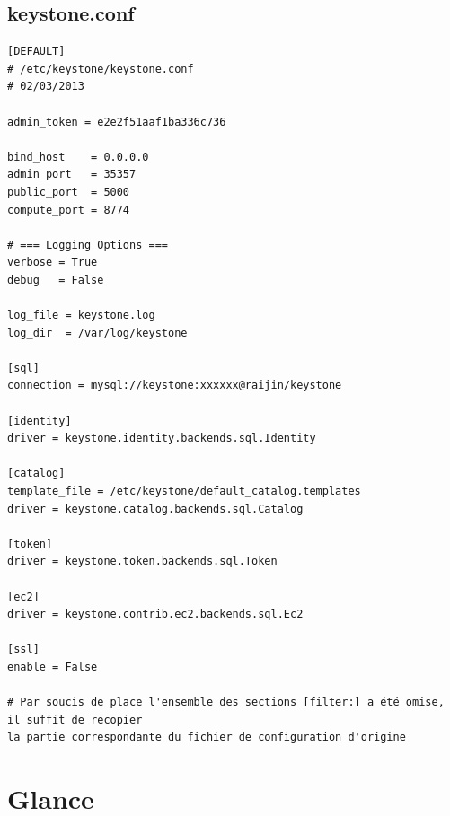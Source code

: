 \documentclass[a4paper,oneside]{report}
\begin{document}
\subsection{keystone.conf}
\begin{verbatim}
[DEFAULT]
# /etc/keystone/keystone.conf
# 02/03/2013

admin_token = e2e2f51aaf1ba336c736

bind_host    = 0.0.0.0
admin_port   = 35357
public_port  = 5000
compute_port = 8774

# === Logging Options ===
verbose = True
debug   = False

log_file = keystone.log
log_dir  = /var/log/keystone

[sql]
connection = mysql://keystone:xxxxxx@raijin/keystone

[identity]
driver = keystone.identity.backends.sql.Identity

[catalog]
template_file = /etc/keystone/default_catalog.templates
driver = keystone.catalog.backends.sql.Catalog

[token]
driver = keystone.token.backends.sql.Token

[ec2]
driver = keystone.contrib.ec2.backends.sql.Ec2

[ssl]
enable = False

# Par soucis de place l'ensemble des sections [filter:] a été omise,  il suffit de recopier
la partie correspondante du fichier de configuration d'origine
\end{verbatim}

\newpage
\section{Glance} \label{conf:Glance}
\end{document}
